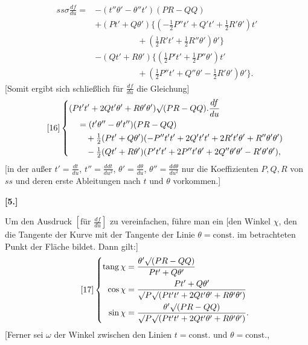 %
\[
\begin{aligned}
ss\sigma\frac{df}{du}={}&-(t''\theta'-\theta''t')(PR-QQ)\\
&+(Pt'+Q\theta')\{(-\tfrac12P''t'+Q't'+\tfrac12R'\theta')t'\\
&\hspace{5em}+(\tfrac12R't'+\tfrac12R''\theta')\theta'\}\\
&-(Qt'+R\theta')\{(\tfrac12P't'+\tfrac12P''\theta')t'\\
&\hspace{5em}+(\tfrac12P''t'+Q''\theta'-\tfrac12R'\theta')\theta'\}.
\end{aligned}
\]
[Somit ergibt sich schließlich für $\frac{df}{du}$ die Gleichung]
\begin{equation}\tag*{[16]}
\left\{\begin{aligned}
&(Pt't'+2Qt'\theta'+R\theta'\theta')\mathord{\surd}(PR-QQ).\frac{df}{du}\\
&\quad=(t'\theta''-\theta't'')(PR-QQ)\\
&\qquad+\tfrac12(Pt'+Q\theta')(-P''t't'+2Q't't'+2R't'\theta'+R''\theta'\theta')\\
&\qquad-\tfrac12(Qt'+R\theta')(P't't'+2P''t'\theta'+2Q''\theta'\theta'-R'\theta'\theta'),
\end{aligned}\right.
\end{equation}
[in der außer $t'=\frac{dt}{du}$, $t''=\frac{ddt}{du^2}$, $\theta'=\frac{d\theta}{du}$, $\theta''=\frac{dd\theta}{du^2}$ nur die Koeffizienten $P,Q,R$ von $ss$ und deren erste Ableitungen nach $t$ und $\theta$ vorkommen.]
\begin{center}\bfseries [5.]\end{center}
\noindent\hspace*{1.2em}Um den Ausdruck $\left[\text{für }\frac{df}{du}\right]$ zu vereinfachen, führe man ein [den Winkel $\chi$, den die Tangente der Kurve mit der Tangente der Linie $\theta=\text{const.}$ im betrachteten Punkt der Fläche bildet. Dann gilt:]
\begin{equation}\tag*{[17]}
\left\{\begin{aligned}
\operatorname{tang}\chi&=\frac{\theta'\mathord{\surd}(PR-QQ)}{Pt'+Q\theta'}\\
\cos\chi&=\frac{Pt'+Q\theta'}{\mathord{\surd}P\mathord{\surd}(Pt't'+2Qt'\theta'+R\theta'\theta')}\\
\sin\chi&=\frac{\theta'\mathord{\surd}(PR-QQ)}{\mathord{\surd}P\mathord{\surd}(Pt't'+2Qt'\theta'+R\theta'\theta')}.
\end{aligned}\right.
\end{equation}
[Ferner sei $\omega$ der Winkel zwischen den Linien $t=\text{const.}$ und $\theta=\text{const.}$,

